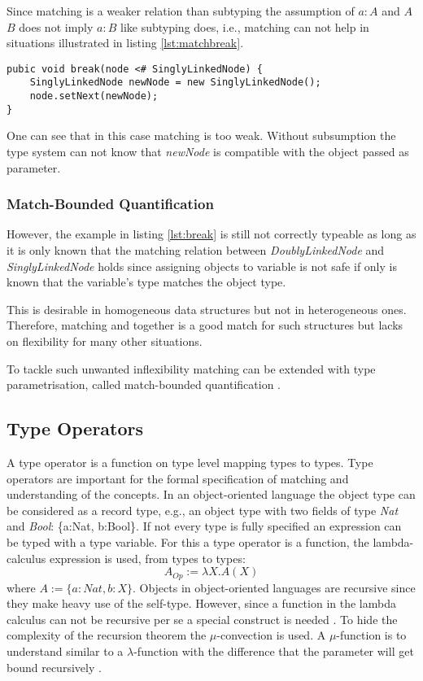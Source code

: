 Since matching is a weaker relation than subtyping the assumption of $a:A$
and $A$ \match $B$ does not imply $a:B$ like subtyping does, i.e., matching
can not help in situations illustrated in listing \ref{lst:matchbreak}.

\begin{lstlisting}[float,label={lst:matchbreak},caption={Matching relation in the break method}]
pubic void break(node <# SinglyLinkedNode) {
	SinglyLinkedNode newNode = new SinglyLinkedNode();
	node.setNext(newNode);
}
\end{lstlisting}

One can see that in this case matching is too weak. Without subsumption the type system
can not know that \emph{newNode} is compatible with the object passed as parameter.

\subsubsection{Match-Bounded Quantification}
However, the example in listing \ref{lst:break} is still not correctly
typeable as long as it is only known that the matching relation between
\emph{DoublyLinkedNode} and \emph{SinglyLinkedNode} holds since assigning
objects to variable is not safe if only is known that the variable's type
matches the object type. 

This is desirable in homogeneous data structures
but not in heterogeneous ones. Therefore, matching and \mytype together is a good match
for such structures but lacks on flexibility for many other situations.

To tackle such unwanted inflexibility matching can be extended
with type parametrisation, called match-bounded quantification
\cite{abadi_subtyping_1996}. 

\subsection{Type Operators}
A type operator is a function on type level mapping types to types. Type
operators are important for the formal specification of matching and
understanding of the concepts. In an object-oriented language the object
type can be considered as a record type, e.g., an object type with two
fields of type \emph{Nat} and \emph{Bool}: \{a:Nat, b:Bool\}. If not
every type is fully specified an expression can be typed with a type
variable. For this a type operator is a function, the lambda-calculus
expression is used, from types to types: \[A_{Op} := \lambda X.A(X)
\] where $A := \{a:Nat, b:X\}$. Objects in object-oriented languages are
recursive since they make heavy use of the self-type. However, since a
function in the lambda calculus can not be recursive per se a special
construct is needed \cite{gabriel_why_1988}.  To hide the complexity of
the recursion theorem the $\mu$-convection is used. A $\mu$-function is
to understand similar to a $\lambda$-function with the difference that
the parameter will get bound recursively \cite{simons_theory_2002-3}.

